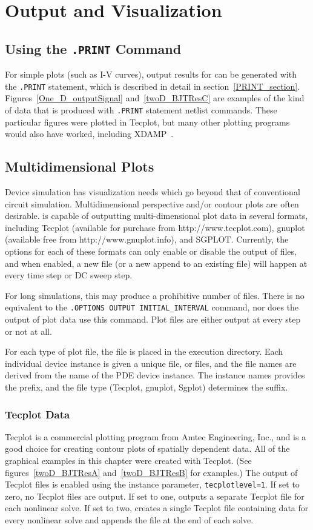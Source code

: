 \section{Output and Visualization}
\label{PDE_Output_Vis}

\subsection{Using the \texttt{.PRINT} Command }
For simple plots (such as I-V curves), output results for \Xyce{}
can be generated with the \texttt{.PRINT} statement, which is described in
detail in section~\ref{PRINT_section}.
Figures~\ref{One_D_outputSignal} and~\ref{twoD_BJTResC} are examples of
the kind of data that is produced with \texttt{.PRINT} statement
netlist commands.  These particular figures were plotted in Tecplot, but
many other plotting programs would also have worked, including
XDAMP~\cite{xdamp}.

\subsection{Multidimensional Plots}
Device simulation has visualization needs which go beyond that of 
conventional circuit simulation.  Multidimensional perspective and/or
contour plots are often desirable.  \Xyce{} is capable of outputting
multi-dimensional plot data in several formats, including Tecplot (available 
for purchase from http://www.tecplot.com), 
gnuplot (available free from http://www.gnuplot.info), and SGPLOT.
Currently, the options for each of these formats can only enable
or disable the output of files, and when enabled, a new file (or a new
append to an existing file) will happen at every time step or DC sweep
step.

For long simulations, this may produce a prohibitive number of files.  There is
no equivalent to the \texttt{.OPTIONS OUTPUT INITIAL\_INTERVAL} command, nor
does the output of plot data use this command.   Plot files are either output
at every step or not at all.

For each type of plot file, the file is placed in the execution directory.
Each individual device instance is given a unique file, or files, and
the file names are derived from the name of the PDE device instance.  The
instance names provides the prefix, and the file type (Tecplot,
gnuplot, Sgplot) determines the suffix.

\subsubsection{Tecplot Data}
Tecplot is a commercial plotting program from Amtec Engineering, Inc.,
and is a good choice for creating contour plots of spatially dependent
data.  All of the graphical examples in this chapter were created with
Tecplot. (See figures~\ref{twoD_BJTResA} and~\ref{twoD_BJTResB} for examples.)
The output of Tecplot files is enabled using the instance parameter,
\texttt{tecplotlevel=1}.  If set to zero, no Tecplot files are output.
If set to one, \Xyce{} outputs a separate Tecplot file for each nonlinear solve.
If set to two, \Xyce{} creates a single Tecplot file containing data for every 
nonlinear solve and appends the file at the end of each solve.

